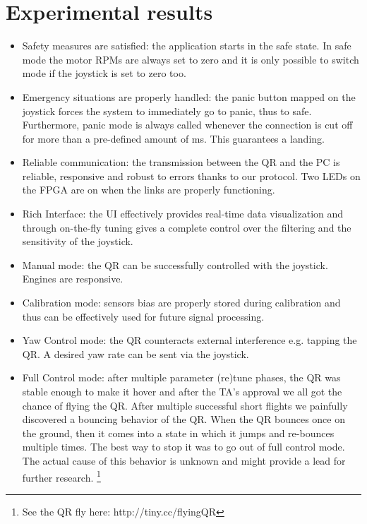 \documentclass[a4paper]{article}
\begin{document}
\section{Experimental results}\label{sec:res}
\begin{itemize}
\setlength\itemsep{0em}
 \item Safety measures are satisfied: the application starts in the safe state. In safe mode the motor RPMs are always set to zero and it is only possible to switch mode if the joystick is set to zero too.
\item Emergency situations are properly handled: the panic button mapped on the joystick forces the system to immediately go to panic, thus to safe. Furthermore, panic mode is always called whenever the connection is cut off for more than a pre-defined amount of ms. This guarantees a landing.
\item Reliable communication: the transmission between the QR and the PC is reliable, responsive and robust to errors thanks to our protocol. Two LEDs on the FPGA are on when the links are properly functioning.
\item Rich Interface: the UI effectively provides real-time data visualization and through on-the-fly tuning gives a complete control over the filtering and the sensitivity of the joystick.
\item Manual mode: the QR can be successfully controlled with the joystick. Engines are responsive. 
\item Calibration mode: sensors bias are properly stored during calibration and thus can be effectively used for future signal processing.
\item Yaw Control mode: the QR counteracts external interference e.g. tapping the QR. A desired yaw rate can be sent via the joystick.
\item Full Control mode: after multiple parameter (re)tune phases, the QR was stable enough to make it hover and after the TA's approval we all got the chance of flying the QR. After multiple successful short flights we painfully discovered a bouncing behavior of the QR. When the QR bounces once on the ground, then it comes into a state in which it jumps and re-bounces multiple times. The best way to stop it was to go out of full control mode. The actual cause of this behavior is unknown and might provide a lead for further research. \footnote{See the QR fly here: http://tiny.cc/flyingQR}

\end{itemize}
\end{document}
